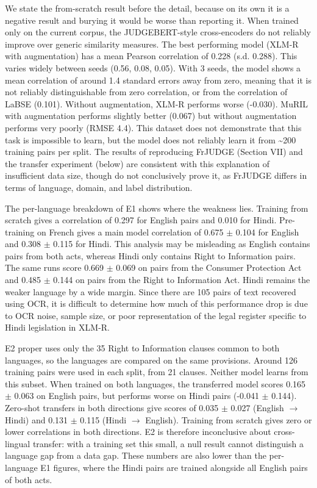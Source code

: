 \documentclass[conference]{IEEEtran}
\begin{document}
We state the from-scratch result before the detail, because on its own it is a negative result and burying it would be worse than reporting it. When trained only on the current corpus, the JUDGEBERT-style cross-encoders do not reliably improve over generic similarity measures. The best performing model (XLM-R with augmentation) has a mean Pearson correlation of 0.228 (s.d. 0.288). This varies widely between seeds (0.56, 0.08, 0.05). With 3 seeds, the model shows a mean correlation of around 1.4 standard errors away from zero, meaning that it is not reliably distinguishable from zero correlation, or from the correlation of LaBSE (0.101). Without augmentation, XLM-R performs worse (-0.030). MuRIL with augmentation performs slightly better (0.067) but without augmentation performs very poorly (RMSE 4.4). This dataset does not demonstrate that this task is impossible to learn, but the model does not reliably learn it from \textasciitilde{}200 training pairs per split. The results of reproducing FrJUDGE (Section VII) and the transfer experiment (below) are consistent with this explanation of insufficient data size, though do not conclusively prove it, as FrJUDGE differs in terms of language, domain, and label distribution.

The per-language breakdown of E1 shows where the weakness lies. Training from scratch gives a correlation of 0.297 for English pairs and 0.010 for Hindi. Pre-training on French gives a main model correlation of 0.675 \ensuremath{\pm} 0.104 for English and 0.308 \ensuremath{\pm} 0.115 for Hindi. This analysis may be misleading as English contains pairs from both acts, whereas Hindi only contains Right to Information pairs. The same runs score 0.669 \ensuremath{\pm} 0.069 on pairs from the Consumer Protection Act and 0.485 \ensuremath{\pm} 0.144 on pairs from the Right to Information Act. Hindi remains the weaker language by a wide margin. Since there are 105 pairs of text recovered using OCR, it is difficult to determine how much of this performance drop is due to OCR noise, sample size, or poor representation of the legal register specific to Hindi legislation in XLM-R.

E2 proper uses only the 35 Right to Information clauses common to both languages, so the languages are compared on the same provisions. Around 126 training pairs were used in each split, from 21 clauses. Neither model learns from this subset. When trained on both languages, the transferred model scores 0.165 \ensuremath{\pm} 0.063 on English pairs, but performs worse on Hindi pairs (-0.041 \ensuremath{\pm} 0.144). Zero-shot transfers in both directions give scores of 0.035 \ensuremath{\pm} 0.027 (English \ensuremath{\rightarrow} Hindi) and 0.131 \ensuremath{\pm} 0.115 (Hindi \ensuremath{\rightarrow} English). Training from scratch gives zero or lower correlations in both directions. E2 is therefore inconclusive about cross-lingual transfer: with a training set this small, a null result cannot distinguish a language gap from a data gap. These numbers are also lower than the per-language E1 figures, where the Hindi pairs are trained alongside all English pairs of both acts.
\end{document}
